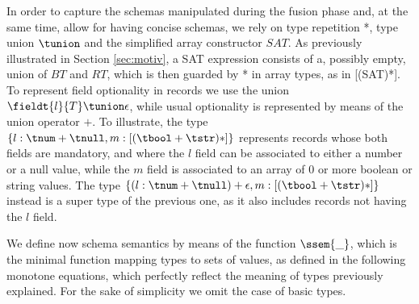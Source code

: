 In order to capture the schemas manipulated during the fusion phase and, at the same time, allow for having concise schemas, we rely on type repetition  *, type union $\tunion$ and the simplified array constructor $SAT$.
As previously  illustrated in Section \ref{sec:motiv},  a SAT expression consists of a, possibly empty,  union of $BT$  and $RT$, which is then guarded by  * in array types, as in  [(SAT)*].  To represent field  optionality in records we use the union $\fieldt{l}{T}\tunion\epsilon$, while usual optionality is represented by means of the union operator $+$. To illustrate, the type $\{l: \tnum +\tnull, m: [(\tbool + \tstr)*]\}$ represents records whose both fields are mandatory, and where the $l$ field can be associated to either a number or a null value, while the $m$ field is associated to an array of $0$ or more boolean or string values. The type $\{(l: \tnum +\tnull)+\epsilon, m: [(\tbool + \tstr)*]\}$ instead is a super type of the previous one, as it also includes records not having the $l$ field.

%



 


We define now schema semantics by means of the function  $\ssem{\_}$, which  is the minimal function mapping types to sets of values, as defined in the following monotone equations, which perfectly reflect the meaning of types previously explained. For the sake of simplicity we omit the case of basic types.%


